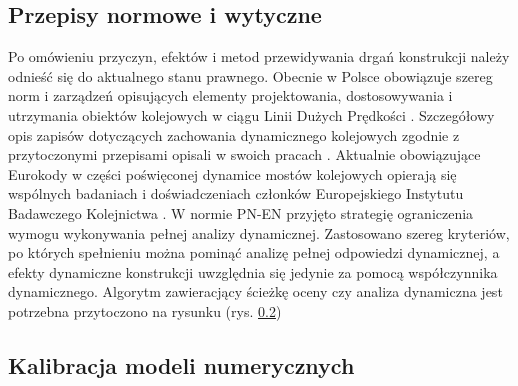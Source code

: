 \subsection{Przepisy normowe i wytyczne}
Po omówieniu przyczyn, efektów i metod przewidywania drgań konstrukcji należy odnieść się do aktualnego stanu prawnego. Obecnie w Polsce obowiązuje szereg norm i zarządzeń opisujących elementy projektowania, dostosowywania i utrzymania obiektów kolejowych w ciągu Linii Dużych Prędkości \parencite{PolskieLinieKolejoweS.A.2005,PolskieLinieKolejoweS.A.2009,PolskiKomitetNormalizacyjny,PolskiKomitetNormalizacyjny2004,PKNj}. Szczegółowy opis zapisów dotyczących zachowania dynamicznego kolejowych zgodnie z przytoczonymi przepisami opisali w swoich pracach \cite{Oleszek2015a,Oleszek2015b,Oleszek2016}. Aktualnie obowiązujące Eurokody w części poświęconej dynamice mostów kolejowych opierają się wspólnych badaniach i doświadczeniach członków Europejskiego Instytutu Badawczego Kolejnictwa  \parencite{ERRI1998,Muncke2008}. W normie PN-EN przyjęto strategię ograniczenia wymogu wykonywania pełnej analizy dynamicznej. Zastosowano szereg kryteriów, po których spełnieniu można pominąć analizę pełnej odpowiedzi dynamicznej, a efekty dynamiczne konstrukcji uwzględnia się jedynie za pomocą współczynnika dynamicznego. Algorytm zawieracjący ścieżkę oceny czy analiza dynamiczna jest potrzebna przytoczono na rysunku (rys. \ref{}) 


\subsection{Kalibracja modeli numerycznych}

